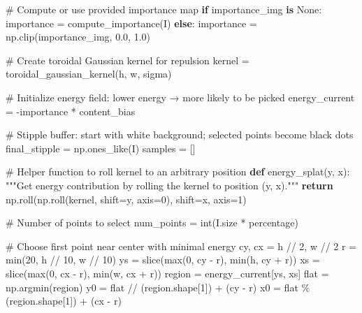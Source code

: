 \documentclass[
  letterpaper,
  DIV=11,
  numbers=noendperiod]{scrartcl}
\newenvironment{Shaded}{\begin{snugshade}}{\end{snugshade}}
\newcommand{\BuiltInTok}[1]{\textcolor[rgb]{0.00,0.23,0.31}{#1}}
\newcommand{\CommentTok}[1]{\textcolor[rgb]{0.37,0.37,0.37}{#1}}
\newcommand{\ControlFlowTok}[1]{\textcolor[rgb]{0.00,0.23,0.31}{\textbf{#1}}}
\newcommand{\DecValTok}[1]{\textcolor[rgb]{0.68,0.00,0.00}{#1}}
\newcommand{\FloatTok}[1]{\textcolor[rgb]{0.68,0.00,0.00}{#1}}
\newcommand{\KeywordTok}[1]{\textcolor[rgb]{0.00,0.23,0.31}{\textbf{#1}}}
\newcommand{\NormalTok}[1]{\textcolor[rgb]{0.00,0.23,0.31}{#1}}
\newcommand{\OperatorTok}[1]{\textcolor[rgb]{0.37,0.37,0.37}{#1}}
\newcommand{\VariableTok}[1]{\textcolor[rgb]{0.07,0.07,0.07}{#1}}
\begin{document}
\begin{Shaded}
\begin{Highlighting}[]
    \CommentTok{\# Compute or use provided importance map}
    \ControlFlowTok{if}\NormalTok{ importance\_img }\KeywordTok{is} \VariableTok{None}\NormalTok{:}
\NormalTok{        importance }\OperatorTok{=}\NormalTok{ compute\_importance(I)}
    \ControlFlowTok{else}\NormalTok{:}
\NormalTok{        importance }\OperatorTok{=}\NormalTok{ np.clip(importance\_img, }\FloatTok{0.0}\NormalTok{, }\FloatTok{1.0}\NormalTok{)}

    \CommentTok{\# Create toroidal Gaussian kernel for repulsion}
\NormalTok{    kernel }\OperatorTok{=}\NormalTok{ toroidal\_gaussian\_kernel(h, w, sigma)}

    \CommentTok{\# Initialize energy field: lower energy → more likely to be picked}
\NormalTok{    energy\_current }\OperatorTok{=} \OperatorTok{{-}}\NormalTok{importance }\OperatorTok{*}\NormalTok{ content\_bias}

    \CommentTok{\# Stipple buffer: start with white background; selected points become black dots}
\NormalTok{    final\_stipple }\OperatorTok{=}\NormalTok{ np.ones\_like(I)}
\NormalTok{    samples }\OperatorTok{=}\NormalTok{ []}

    \CommentTok{\# Helper function to roll kernel to an arbitrary position}
    \KeywordTok{def}\NormalTok{ energy\_splat(y, x):}
        \CommentTok{"""Get energy contribution by rolling the kernel to position (y, x)."""}
        \ControlFlowTok{return}\NormalTok{ np.roll(np.roll(kernel, shift}\OperatorTok{=}\NormalTok{y, axis}\OperatorTok{=}\DecValTok{0}\NormalTok{), shift}\OperatorTok{=}\NormalTok{x, axis}\OperatorTok{=}\DecValTok{1}\NormalTok{)}

    \CommentTok{\# Number of points to select}
\NormalTok{    num\_points }\OperatorTok{=} \BuiltInTok{int}\NormalTok{(I.size }\OperatorTok{*}\NormalTok{ percentage)}

    \CommentTok{\# Choose first point near center with minimal energy}
\NormalTok{    cy, cx }\OperatorTok{=}\NormalTok{ h }\OperatorTok{//} \DecValTok{2}\NormalTok{, w }\OperatorTok{//} \DecValTok{2}
\NormalTok{    r }\OperatorTok{=} \BuiltInTok{min}\NormalTok{(}\DecValTok{20}\NormalTok{, h }\OperatorTok{//} \DecValTok{10}\NormalTok{, w }\OperatorTok{//} \DecValTok{10}\NormalTok{)}
\NormalTok{    ys }\OperatorTok{=} \BuiltInTok{slice}\NormalTok{(}\BuiltInTok{max}\NormalTok{(}\DecValTok{0}\NormalTok{, cy }\OperatorTok{{-}}\NormalTok{ r), }\BuiltInTok{min}\NormalTok{(h, cy }\OperatorTok{+}\NormalTok{ r))}
\NormalTok{    xs }\OperatorTok{=} \BuiltInTok{slice}\NormalTok{(}\BuiltInTok{max}\NormalTok{(}\DecValTok{0}\NormalTok{, cx }\OperatorTok{{-}}\NormalTok{ r), }\BuiltInTok{min}\NormalTok{(w, cx }\OperatorTok{+}\NormalTok{ r))}
\NormalTok{    region }\OperatorTok{=}\NormalTok{ energy\_current[ys, xs]}
\NormalTok{    flat }\OperatorTok{=}\NormalTok{ np.argmin(region)}
\NormalTok{    y0 }\OperatorTok{=}\NormalTok{ flat }\OperatorTok{//}\NormalTok{ (region.shape[}\DecValTok{1}\NormalTok{]) }\OperatorTok{+}\NormalTok{ (cy }\OperatorTok{{-}}\NormalTok{ r)}
\NormalTok{    x0 }\OperatorTok{=}\NormalTok{ flat }\OperatorTok{\%}\NormalTok{ (region.shape[}\DecValTok{1}\NormalTok{]) }\OperatorTok{+}\NormalTok{ (cx }\OperatorTok{{-}}\NormalTok{ r)}


\end{Highlighting}
\end{Shaded}
\end{document}
